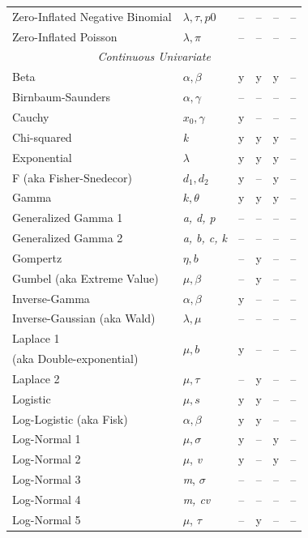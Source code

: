 {\begin{center}
\begin{longtable}{l | lcccc}
Zero-Inflated Negative Binomial & $\lambda, \tau, p0$	& --  & --  & --  &  -- \\
Zero-Inflated Poisson	& $\lambda, \pi$	& --  & --  & --  &  -- \\
  \hline
  \multicolumn{6}{c}{\textit{Continuous Univariate}}	\\
  \hline
Beta					& $\alpha, \beta$	& y	& y	& y	&  -- \\
Birnbaum-Saunders		& $\alpha, \gamma$	& --	& --	& --	&  -- \\
Cauchy				& $x_0, \gamma$	& y	& --  & --  &  -- \\
Chi-squared			& \emph{k}		& y	& y	& y	&  -- \\
Exponential			& $\lambda$		& y	& y	& y	&  -- \\
F (aka Fisher-Snedecor)	& $d_1, d_2$		& y	& --  & y	&  -- \\
Gamma				& $k, \theta$		& y	& y	& y	&  -- \\
Generalized Gamma 1	& \emph{a, d, p}	& --	& --  & --  & --  \\
Generalized Gamma 2	& \emph{a, b, c, k}	& --	& --  & --  & --  \\
Gompertz				& $\eta, b$		& --  & y	& --  & --  \\
Gumbel (aka Extreme Value)	& $\mu, \beta$	& --  & y 	& --  & -- \\ 
Inverse-Gamma		& $\alpha, \beta$	& y	& --  & --  &  -- \\
Inverse-Gaussian (aka Wald)	& $\lambda, \mu$	& --	& --  & --  &  -- \\
Laplace 1				& \multirow{2}{*}{$\mu, b$} &	\multirow{2}{*}{y}	&	\multirow{2}{*}{--}	& \multirow{2}{*}{--}  & \multirow{2}{*}{--} \\ 
(aka Double-exponential) \\
Laplace 2				& $\mu, \tau$ 		&	--	&	y	& --  & -- \\ 
Logistic				& $\mu, s$		&	y	&	y	& --  &  -- \\
Log-Logistic (aka Fisk)	& $\alpha, \beta$		&	y	&	y	& --  &  -- \\
Log-Normal 1			& $\mu, \sigma$	&	y	&	--	&	y	&  -- \\
Log-Normal 2			& $\mu$, \textit{v}	&	y	&	--	&	y	&  -- \\
Log-Normal 3			& \emph{m}, $\sigma$	&	--	&	--	&	--	&  -- \\
Log-Normal 4			& \emph{m, cv}		& 	--	&	--	&	--	&  -- \\
Log-Normal 5			& $\mu$, $\tau$	& 	--	&	y	&	--	&  -- \\

\end{longtable}
\end{center}}
